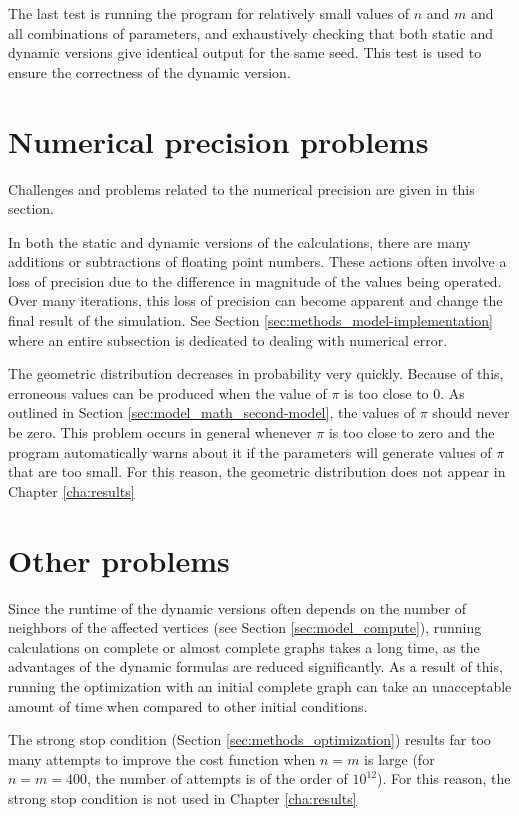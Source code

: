 The last test is running the program for relatively small values of $n$ and $m$ and all combinations of parameters, and exhaustively checking that both static and dynamic versions give identical output for the same seed.
This test is used to ensure the correctness of the dynamic version.

\section{Numerical precision problems}
\label{sec:methods_num-prec-probs}

Challenges and problems related to the numerical precision are given in this section.

In both the static and dynamic versions of the calculations, there are many additions or subtractions of floating point numbers.
These actions often involve a loss of precision due to the difference in magnitude of the values being operated.
Over many iterations, this loss of precision can become apparent and change the final result of the simulation.
See Section \ref{sec:methods_model-implementation} where an entire subsection is dedicated to dealing with numerical error.

The geometric distribution decreases in probability very quickly.
Because of this, erroneous values can be produced when the value of $\pi$ is too close to 0.
As outlined in Section \ref{sec:model_math_second-model}, the values of $\pi$ should never be zero.
This problem occurs in general whenever $\pi$ is too close to zero and the program automatically warns about it if the parameters will generate values of $\pi$ that are too small.
For this reason, the geometric distribution does not appear in Chapter \ref{cha:results}

\section{Other problems}
\label{sec:methods_other-probs}

Since the runtime of the dynamic versions often depends on the number of neighbors of the affected vertices (see Section \ref{sec:model_compute}), running calculations on complete or almost complete graphs takes a long time, as the advantages of the dynamic formulas are reduced significantly.
As a result of this, running the optimization with an initial complete graph can take an unacceptable amount of time when compared to other initial conditions.

The strong stop condition (Section \ref{sec:methods_optimization}) results far too many attempts to improve the cost function when $n=m$ is large (for $n=m=400$, the number of attempts is of the order of $10^{12}$).
For this reason, the strong stop condition is not used in Chapter \ref{cha:results}

